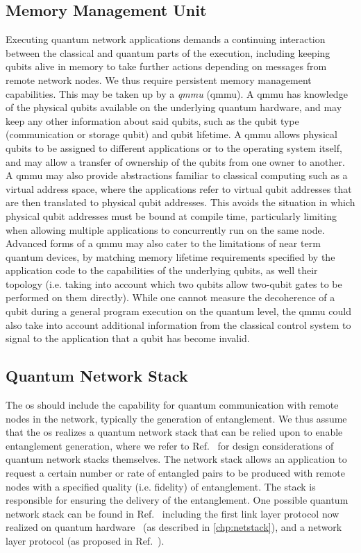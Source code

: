 \subsection{Memory Management Unit}

Executing quantum network applications demands a continuing interaction between the classical and
quantum parts of the execution, including keeping qubits alive in memory to take further actions
depending on messages from remote network nodes. We thus require persistent memory management
capabilities. This may be taken up by a \emph{\acrlong{qmmu}} (\acrshort{qmmu}). A \acrshort{qmmu}
has knowledge of the physical qubits available on the underlying quantum hardware, and may keep any
other information about said qubits, such as the qubit type (communication or storage qubit) and
qubit lifetime. A \acrshort{qmmu} allows physical qubits to be assigned to different applications or
to the operating system itself, and may allow a transfer of ownership of the qubits from one owner
to another. A \acrshort{qmmu} may also provide abstractions familiar to classical computing such as
a virtual address space, where the applications refer to virtual qubit addresses that are then
translated to physical qubit addresses. This avoids the situation in which physical qubit addresses
must be bound at compile time, particularly limiting when allowing multiple applications to
concurrently run on the same node. Advanced forms of a \acrshort{qmmu} may also cater to the
limitations of near term quantum devices, by matching memory lifetime requirements specified by the
application code to the capabilities of the underlying qubits, as well their topology (i.e. taking
into account which two qubits allow two-qubit gates to be performed on them directly). While one
cannot measure the decoherence of a qubit during a general program execution on the quantum level,
the \acrshort{qmmu} could also take into account additional information from the classical control
system to signal to the application that a qubit has become invalid.

\subsection{Quantum Network Stack}

The \acrshort{os} should include the capability for quantum communication with remote nodes in the
network, typically the generation of entanglement. We thus assume that the \acrshort{os} realizes a
quantum network stack that can be relied upon to enable entanglement generation, where we refer to
Ref.~\cite{dahlberg_2019_egp} for design considerations of quantum network stacks themselves. The
network stack allows an application to request a certain number or rate of entangled pairs to be
produced with remote nodes with a specified quality (i.e. fidelity) of entanglement. The stack is
responsible for ensuring the delivery of the entanglement. One possible quantum network stack can be
found in Ref.~\cite{dahlberg_2019_egp} including the first link layer protocol now realized on
quantum hardware~\cite{pompili_2022_experimental} (as described in \cref{chp:netstack}), and a
network layer protocol (as proposed in Ref.~\cite{kozlowski_2020_qnp}).

